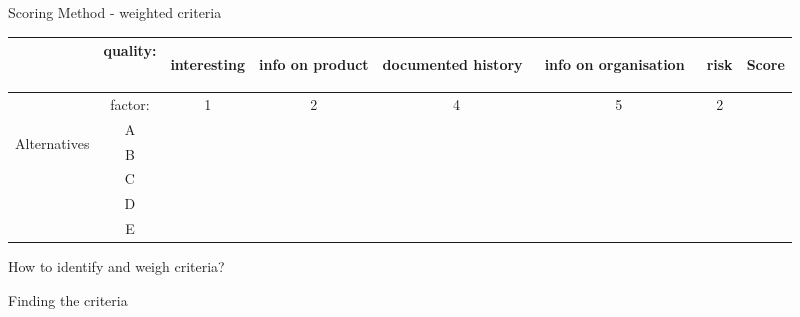 \begin{frame}{Scoring Method - weighted criteria}
    \begin{tabular}{|c|c|c|c|c|c|c|c|}
    \hline 
     & quality: & \begin{turn}{90}
    interesting
    \end{turn} & \begin{turn}{90}
    info on product
    \end{turn} & \begin{turn}{90}
    documented history~
    \end{turn} & \begin{turn}{90}
    info on organisation~
    \end{turn} & \begin{turn}{90}
    risk
    \end{turn} &  \begin{turn}{90}
    Score
    \end{turn}\tabularnewline
    \hline 
     & factor: & 1 & 2 & 4 & 5 & 2 & \tabularnewline
    \hline 
    \hline 
    \multirow{5}{*}{\begin{turn}{90}
    Alternatives
    \end{turn}} & A &  &  &  & &  & \tabularnewline
    \cline{2-7} 
     & B &  &  &  &  &  & \tabularnewline
    \cline{2-7} 
     & C &  &  &  &  &  & \tabularnewline
    \cline{2-7} 
     & D &  &  &  &  &  & \tabularnewline
    \cline{2-7} 
     & E &  &  &  &  &  & \tabularnewline
    \hline 
    \end{tabular}
\end{frame}


\begin{frame}{How to identify and weigh criteria?}
    
\end{frame}

\begin{frame}{Finding the criteria}
    
\end{frame}

